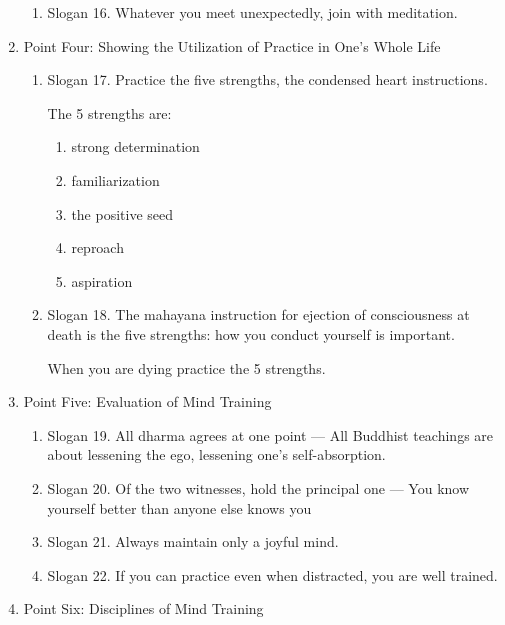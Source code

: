 \begin{enumerate}
\begin{enumerate}
        \item Slogan 16. Whatever you meet unexpectedly, join with meditation.
    \end{enumerate}
    \item Point Four: Showing the Utilization of Practice in One's Whole Life
      \begin{enumerate}
        \item Slogan 17. Practice the five strengths, the condensed heart instructions.

            The 5 strengths are: 
              \begin{enumerate}
                  \item strong determination
                  \item familiarization
                  \item the positive seed
                  \item reproach
                  \item aspiration
              \end{enumerate}
        \item Slogan 18. The mahayana instruction for ejection of consciousness at death is the five strengths: how you conduct yourself is important.

            When you are dying practice the 5 strengths.

      \end{enumerate}
    \item Point Five: Evaluation of Mind Training
      \begin{enumerate}
        \item Slogan 19. All dharma agrees at one point --- All Buddhist teachings are about lessening the ego, lessening one's self-absorption.
        \item Slogan 20. Of the two witnesses, hold the principal one --- You know yourself better than anyone else knows you
        \item Slogan 21. Always maintain only a joyful mind.
        \item Slogan 22. If you can practice even when distracted, you are well trained.
      \end{enumerate}
    \item Point Six: Disciplines of Mind Training
      \begin{enumerate}


\end{enumerate}
\end{enumerate}
